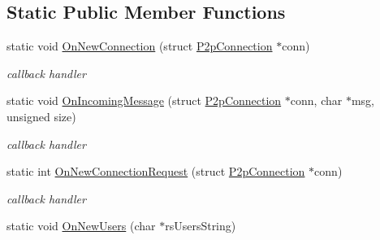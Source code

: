 \subsection*{Static Public Member Functions}
\begin{DoxyCompactItemize}
\item 
\hypertarget{classIceWrapper_abd014f6ec26849dac26d38ba147d7240}{
static void \hyperlink{classIceWrapper_abd014f6ec26849dac26d38ba147d7240}{OnNewConnection} (struct \hyperlink{structP2pConnection}{P2pConnection} $\ast$conn)}
\label{classIceWrapper_abd014f6ec26849dac26d38ba147d7240}

\begin{DoxyCompactList}\small\item\em callback handler \item\end{DoxyCompactList}\item 
\hypertarget{classIceWrapper_abee757e1e75c9899efab4de089fbdd3a}{
static void \hyperlink{classIceWrapper_abee757e1e75c9899efab4de089fbdd3a}{OnIncomingMessage} (struct \hyperlink{structP2pConnection}{P2pConnection} $\ast$conn, char $\ast$msg, unsigned size)}
\label{classIceWrapper_abee757e1e75c9899efab4de089fbdd3a}

\begin{DoxyCompactList}\small\item\em callback handler \item\end{DoxyCompactList}\item 
\hypertarget{classIceWrapper_a5278b80ee2ca85106989f6f4c5326d2a}{
static int \hyperlink{classIceWrapper_a5278b80ee2ca85106989f6f4c5326d2a}{OnNewConnectionRequest} (struct \hyperlink{structP2pConnection}{P2pConnection} $\ast$conn)}
\label{classIceWrapper_a5278b80ee2ca85106989f6f4c5326d2a}

\begin{DoxyCompactList}\small\item\em callback handler \item\end{DoxyCompactList}\item 
\hypertarget{classIceWrapper_ad5e9159fda434266b08d5e060ce8072e}{
static void \hyperlink{classIceWrapper_ad5e9159fda434266b08d5e060ce8072e}{OnNewUsers} (char $\ast$rsUsersString)}
\label{classIceWrapper_ad5e9159fda434266b08d5e060ce8072e}


\end{DoxyCompactItemize}
